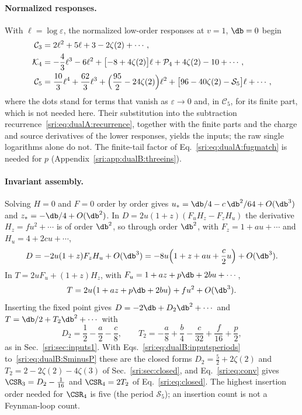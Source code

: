 \paragraph{Normalized responses.} With $\ell=\log\varepsilon$, the normalized low-order responses at $v=1$, $\db=0$
begin
\begin{align}
 \mathcal C_3&=2\ell^2+5\ell+3-2\zeta(2)+\cdots,\label{sri:eq:dualB:C3}\\
 \mathcal K_4&=-\frac43\ell^3-6\ell^2+\bigl[-8+4\zeta(2)\bigr]\ell+\mathcal P_4+4\zeta(2)-10+\cdots,\label{sri:eq:dualB:K4}\\
 \mathcal C_5&=\frac{10}{3}\ell^4+\frac{62}{3}\ell^3+\Bigl(\frac{95}{2}-24\zeta(2)\Bigr)\ell^2
 +\bigl[96-40\zeta(2)-\mathcal S_5\bigr]\ell+\cdots,\label{sri:eq:dualB:C5}
\end{align}
where the dots stand for terms that vanish as $\varepsilon\to0$ and, in $\mathcal C_5$, for its finite part, which is
not needed here. Their substitution into the subtraction recurrence~\eqref{sri:eq:dualA:recurrence}, together with the
finite parts and the charge and source derivatives of the lower responses, yields the inputs; the raw single
logarithms alone do not. The finite-tail factor of Eq.~\eqref{sri:eq:dualA:fugmatch} is needed for $p$
(Appendix~\ref{sri:app:dualB:threeins}).

\paragraph{Invariant assembly.} Solving $H=0$ and $F=0$ order by order gives $u_*=\db/4-c\,\db^2/64+O(\db^3)$ and
$z_*=-\db/4+O(\db^2)$. In $D=2u(1+z)(F_uH_z-F_zH_u)$ the derivative $H_z=fu^2+\cdots$ is of order $\db^2$, so through
order $\db^2$, with $F_z=1+au+\cdots$ and $H_u=4+2cu+\cdots$,
\begin{equation}
 D=-2u(1+z)F_zH_u+O(\db^3)=-8u\Bigl(1+z+au+\frac c2u\Bigr)+O(\db^3).
\end{equation}
In $T=2uF_u+(1+z)H_z$, with $F_u=1+az+p\db+2bu+\cdots$,
\begin{equation}
 T=2u\bigl(1+az+p\db+2bu\bigr)+fu^2+O(\db^3).
\end{equation}
Inserting the fixed point gives $D=-2\db+D_2\db^2+\cdots$ and $T=\db/2+T_2\db^2+\cdots$ with
\begin{equation}
 D_2=\frac12-\frac a2-\frac c8,\qquad T_2=-\frac a8+\frac b4-\frac c{32}+\frac f{16}+\frac p2,
\end{equation}
as in Sec.~\ref{sri:sec:inputs1}. With Eqs.~\eqref{sri:eq:dualB:inputsperiods} to~\eqref{sri:eq:dualB:SminusP} these are the
closed forms $D_2=\frac52+2\zeta(2)$ and $T_2=2-2\zeta(2)-4\zeta(3)$ of Sec.~\ref{sri:sec:closed}, and Eq.~\eqref{sri:eq:conv}
gives $\CSR_3=D_2-\frac1{16}$ and $\CSR_4=2T_2$ of Eq.~\eqref{sri:eq:closed}. The highest insertion order needed for
$\CSR_4$ is five (the period $\mathcal S_5$); an insertion count is not a Feynman-loop count.

